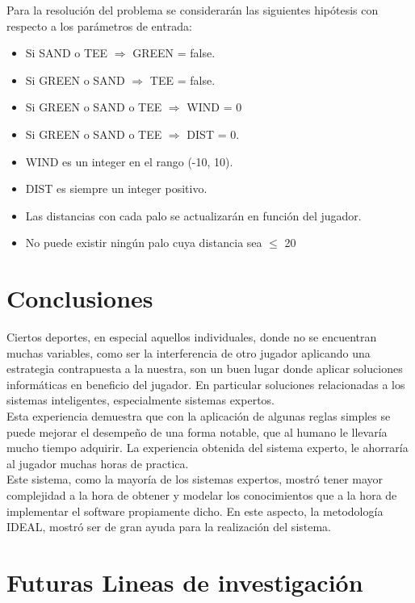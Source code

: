 \documentclass[runningheads,a4paper]{llncs}
\begin{document}
Para la resolución del problema se considerarán las siguientes hipótesis con respecto a los parámetros de entrada:\\
\begin{itemize}
	\item Si SAND o TEE $\Rightarrow$ GREEN = false.
	\item Si GREEN o SAND $\Rightarrow$ TEE = false.
	\item Si GREEN o SAND o TEE $\Rightarrow$ WIND = 0 
	\item Si GREEN o SAND o TEE $\Rightarrow$ DIST = 0.
	\item WIND es un integer en el rango (-10, 10).
	\item DIST es siempre un integer positivo.
	\item Las distancias con cada palo se actualizarán en función del jugador.
	\item No puede existir ningún palo cuya distancia sea $\leq$ 20
\end{itemize}


\section{Conclusiones}

Ciertos deportes, en especial aquellos individuales, donde no se encuentran muchas variables, como ser
la interferencia de otro jugador aplicando una estrategia contrapuesta a la nuestra, son un buen lugar
donde aplicar soluciones informáticas en beneficio del jugador. En particular soluciones relacionadas a
los sistemas inteligentes, especialmente sistemas expertos.\\
Esta experiencia demuestra que con la aplicación de algunas reglas simples se puede mejorar el desempeño
de una forma notable, que al humano le llevaría mucho tiempo adquirir. La experiencia obtenida del sistema experto, le ahorraría al jugador muchas horas de practica.\\
Este sistema, como la mayoría de los sistemas expertos, mostró tener mayor complejidad a la hora de  obtener y modelar los conocimientos que a la hora de implementar el software propiamente dicho. En este aspecto, la metodología IDEAL, mostró ser de gran ayuda para la realización del sistema.

\section{Futuras Lineas de investigación}
\end{document}
